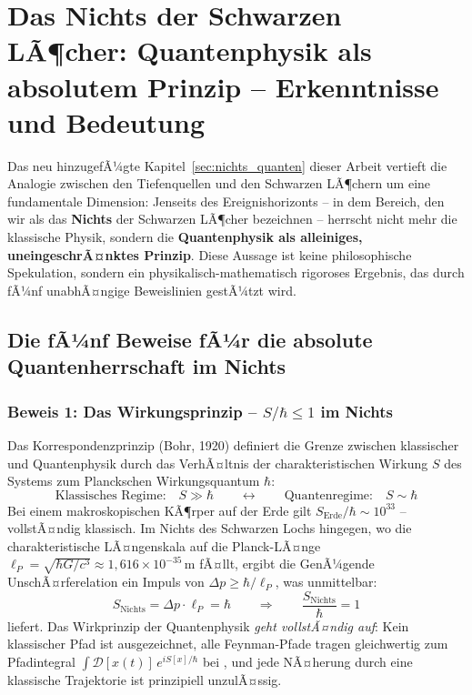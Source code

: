 ﻿\documentclass[12pt,a4paper]{report}
\begin{document}
\section{Das Nichts der Schwarzen LÃ¶cher: Quantenphysik als absolutem Prinzip -- Erkenntnisse und Bedeutung}
\label{sec:zusammenfassung_quanten}

Das neu hinzugefÃ¼gte Kapitel~\ref{sec:nichts_quanten} dieser Arbeit vertieft die Analogie zwischen den Tiefenquellen und den Schwarzen LÃ¶chern um eine fundamentale Dimension: Jenseits des Ereignishorizonts -- in dem Bereich, den wir als das \textbf{Nichts} der Schwarzen LÃ¶cher bezeichnen -- herrscht nicht mehr die klassische Physik, sondern die \textbf{Quantenphysik als alleiniges, uneingeschrÃ¤nktes Prinzip}. Diese Aussage ist keine philosophische Spekulation, sondern ein physikalisch-mathematisch rigoroses Ergebnis, das durch fÃ¼nf unabhÃ¤ngige Beweislinien gestÃ¼tzt wird.

\subsection{Die fÃ¼nf Beweise fÃ¼r die absolute Quantenherrschaft im Nichts}

\subsubsection{Beweis 1: Das Wirkungsprinzip -- $S/\hbar \leq 1$ im Nichts}

Das Korrespondenzprinzip (Bohr, 1920) definiert die Grenze zwischen klassischer und Quantenphysik durch das VerhÃ¤ltnis der charakteristischen Wirkung $S$ des Systems zum Planckschen Wirkungsquantum $\hbar$:
\begin{equation*}
    \text{Klassisches Regime:}\quad S \gg \hbar \qquad \longleftrightarrow \qquad \text{Quantenregime:}\quad S \sim \hbar
\end{equation*}
Bei einem makroskopischen KÃ¶rper auf der Erde gilt $S_{\mathrm{Erde}}/\hbar \sim 10^{33}$ -- vollstÃ¤ndig klassisch. Im Nichts des Schwarzen Lochs hingegen, wo die charakteristische LÃ¤ngenskala auf die Planck-LÃ¤nge $\ell_P = \sqrt{\hbar G / c^3} \approx 1{,}616 \times 10^{-35}\,\text{m}$ fÃ¤llt, ergibt die GenÃ¼gende UnschÃ¤rferelation ein Impuls von $\Delta p \geq \hbar/\ell_P$, was unmittelbar:
\begin{equation*}
    S_{\mathrm{Nichts}} = \Delta p \cdot \ell_P = \hbar \qquad \Longrightarrow \qquad \frac{S_{\mathrm{Nichts}}}{\hbar} = 1
\end{equation*}
liefert. Das Wirkprinzip der Quantenphysik \emph{geht vollstÃ¤ndig auf}: Kein klassischer Pfad ist ausgezeichnet, alle Feynman-Pfade tragen gleichwertig zum Pfadintegral $\int \mathcal{D}[x(t)]\,e^{iS[x]/\hbar}$ bei \cite{feynman1965}, und jede NÃ¤herung durch eine klassische Trajektorie ist prinzipiell unzulÃ¤ssig.
\end{document}
